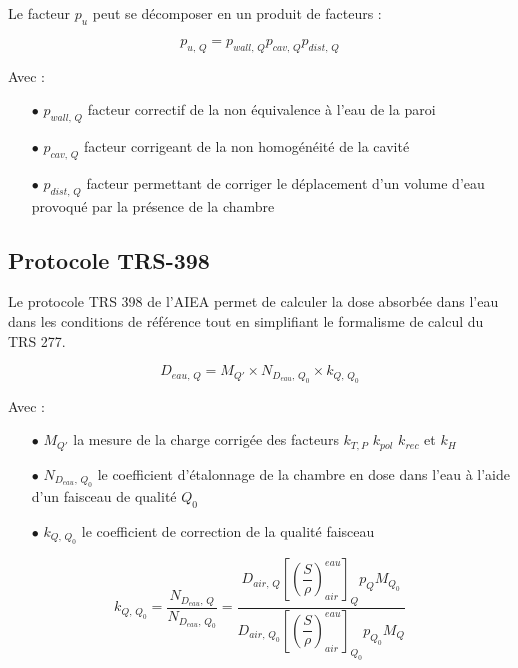 \documentclass{article}
\begin{document}
Le facteur $p_u$ peut se décomposer en un produit de facteurs :

\begin{equation}
  p_{u,\, Q} = p_{wall,\, Q} p_{cav,\, Q} p_{dist,\, Q}
  \label{eq_pu}
\end{equation}

Avec :
\begin{itemize}
  \item[$\bullet$] $p_{wall,\, Q}$ facteur correctif de la non équivalence à l'eau de la paroi
  \item[$\bullet$] $p_{cav,\, Q}$ facteur corrigeant de la non homogénéité de la cavité
  \item[$\bullet$] $p_{dist,\, Q}$ facteur permettant de corriger le déplacement d'un volume d'eau provoqué par la présence de la chambre
\end{itemize}

\subsection{Protocole TRS-398}

Le protocole TRS 398 de l'AIEA \cite{international2001iaea} permet de calculer la dose absorbée dans l'eau dans les conditions de référence tout en simplifiant le formalisme de calcul du TRS 277.

\begin{equation}
  D_{eau,\, Q} = M_{Q'} \times N_{D_{eau},\, Q_0} \times k_{Q,\, Q_0}
  \label{eq_dose_398}
\end{equation}

Avec :
\begin{itemize}
  \item[$\bullet$] $M_{Q'}$ la mesure de la charge corrigée des facteurs $k_{T,P}$ $k_{pol}$ $k_{rec}$ et $k_H$
  \item[$\bullet$] $N_{D_{eau},\, Q_0}$ le coefficient d'étalonnage de la chambre en dose dans l'eau à l'aide d'un faisceau de qualité $Q_0$ 
  \item[$\bullet$] $k_{Q,\, Q_0}$ le coefficient de correction de la qualité faisceau
\end{itemize}

\begin{equation}
  k_{Q,\, Q_0} = \dfrac{N_{D_{eau},\, Q}}{N_{D_{eau},\, Q_0}} = \dfrac{D_{air,\, Q} \left[\left(\dfrac{S}{\rho}\right) ^{eau}_{air}\right]_Q p_Q M_{Q_0}}{D_{air,\, Q_0 } \left[\left(\dfrac{S}{\rho}\right) ^{eau}_{air}\right]_{Q_0} p_{Q_0} M_Q}
\end{equation}
\end{document}
